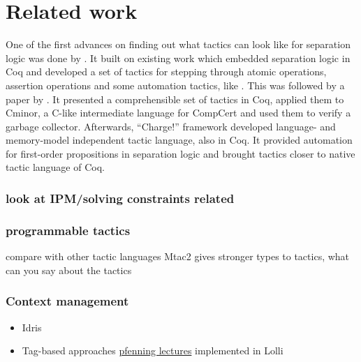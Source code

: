 \chapter{Related work}
\label{cha:related-work}

One of the first advances on finding out what tactics can look like for separation logic was done by \citet{appel2006tactics}.
It built on existing work which embedded separation logic in Coq and developed a set of tactics for stepping through atomic operations, assertion operations and some automation tactics, like .
This was followed by a paper by \citet{mccreightPracticalTacticsSeparation2009}.
It presented a comprehensible set of tactics in Coq, applied them to Cminor, a C-like intermediate language for CompCert and used them to verify a garbage collector.
Afterwards, ``Charge!'' framework \cite{bengtsonCharge2012} developed language- and memory-model independent tactic language, also in Coq.
It provided automation for first-order propositions in separation logic and brought tactics closer to native tactic language of Coq.

\subsection{look at IPM/solving constraints related}

\subsection{programmable tactics}

compare with other tactic languages
Mtac2 gives stronger types to tactics, what can you say about the tactics

\subsection{Context management}
\label{sec:context-management}

\begin{itemize}
\item Idris \cite{MultiplicitiesIdris2Documentation}
\item Tag-based approaches \citet{hodasTagFrameSystemResource2002} \citet{lopezImplementingEfficientResource2004}
  \href{http://www-cgi.cs.cmu.edu/afs/cs/user/fp/www/courses/lp/lectures/15-resources.pdf}{pfenning lectures}
  implemented in Lolli \cite{LolliLinearLogic}
\end{itemize}

